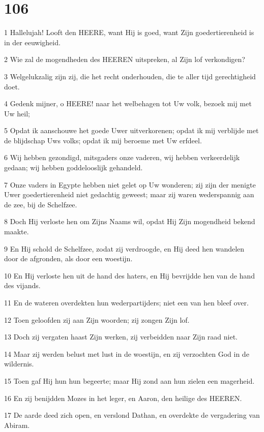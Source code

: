 \chapter{106}

\par 1 Hallelujah! Looft den HEERE, want Hij is goed, want Zijn goedertierenheid is in der eeuwigheid.
\par 2 Wie zal de mogendheden des HEEREN uitspreken, al Zijn lof verkondigen?
\par 3 Welgelukzalig zijn zij, die het recht onderhouden, die te aller tijd gerechtigheid doet.
\par 4 Gedenk mijner, o HEERE! naar het welbehagen tot Uw volk, bezoek mij met Uw heil;
\par 5 Opdat ik aanschouwe het goede Uwer uitverkorenen; opdat ik mij verblijde met de blijdschap Uws volks; opdat ik mij beroeme met Uw erfdeel.
\par 6 Wij hebben gezondigd, mitsgaders onze vaderen, wij hebben verkeerdelijk gedaan; wij hebben goddelooslijk gehandeld.
\par 7 Onze vaders in Egypte hebben niet gelet op Uw wonderen; zij zijn der menigte Uwer goedertierenheid niet gedachtig geweest; maar zij waren wederspannig aan de zee, bij de Schelfzee.
\par 8 Doch Hij verloste hen om Zijns Naams wil, opdat Hij Zijn mogendheid bekend maakte.
\par 9 En Hij schold de Schelfzee, zodat zij verdroogde, en Hij deed hen wandelen door de afgronden, als door een woestijn.
\par 10 En Hij verloste hen uit de hand des haters, en Hij bevrijdde hen van de hand des vijands.
\par 11 En de wateren overdekten hun wederpartijders; niet een van hen bleef over.
\par 12 Toen geloofden zij aan Zijn woorden; zij zongen Zijn lof.
\par 13 Doch zij vergaten haast Zijn werken, zij verbeidden naar Zijn raad niet.
\par 14 Maar zij werden belust met lust in de woestijn, en zij verzochten God in de wildernis.
\par 15 Toen gaf Hij hun hun begeerte; maar Hij zond aan hun zielen een magerheid.
\par 16 En zij benijdden Mozes in het leger, en Aaron, den heilige des HEEREN.
\par 17 De aarde deed zich open, en verslond Dathan, en overdekte de vergadering van Abiram.
